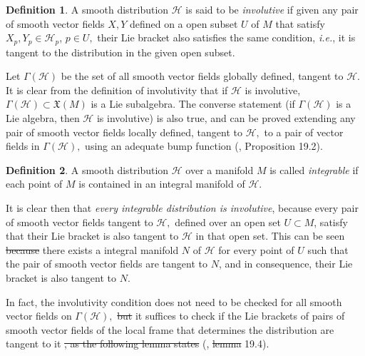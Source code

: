 \documentclass[12pt, letterpaper, reqno]{amsart}
\theoremstyle{definition}
\newtheorem{df}{Definition}
\theoremstyle{plain}
\theoremstyle{remark}
\providecommand{\DIFadd}[1]{{\protect\color{blue}\uwave{#1}}} %
\providecommand{\DIFdel}[1]{{\protect\color{red}\sout{#1}}}                      %
\providecommand{\DIFaddbegin}{} %
\providecommand{\DIFaddend}{} %
\providecommand{\DIFdelbegin}{} %
\providecommand{\DIFdelend}{} %
\newcommand{\DIFscaledelfig}{0.5}
\newlength{\DIFdelgraphicswidth} %
\newlength{\DIFdelgraphicsheight} %
\newcommand{\DIFaddincludegraphics}[2][]{{\color{blue}\fbox{\DIFOincludegraphics[#1]{#2}}}} %
\newcommand{\DIFdelincludegraphics}[2][]{%
\sbox{\DIFdelgraphicsbox}{\DIFOincludegraphics[#1]{#2}}%
\settoboxwidth{\DIFdelgraphicswidth}{\DIFdelgraphicsbox} %
\settoboxtotalheight{\DIFdelgraphicsheight}{\DIFdelgraphicsbox} %
\scalebox{\DIFscaledelfig}{%
\parbox[b]{\DIFdelgraphicswidth}{\usebox{\DIFdelgraphicsbox}\\[-\baselineskip] \rule{\DIFdelgraphicswidth}{0em}}\llap{\resizebox{\DIFdelgraphicswidth}{\DIFdelgraphicsheight}{%
\setlength{\unitlength}{\DIFdelgraphicswidth}%
\begin{picture}(1,1)%
\thicklines\linethickness{2pt} %
{\color[rgb]{1,0,0}\put(0,0){\framebox(1,1){}}}%
{\color[rgb]{1,0,0}\put(0,0){\line( 1,1){1}}}%
{\color[rgb]{1,0,0}\put(0,1){\line(1,-1){1}}}%
\end{picture}%
}\hspace*{3pt}}} %
} %
\DeclareRobustCommand{\DIFaddbegin}{\DIFOaddbegin \let\includegraphics\DIFaddincludegraphics} %
\DeclareRobustCommand{\DIFaddend}{\DIFOaddend \let\includegraphics\DIFOincludegraphics} %
\DeclareRobustCommand{\DIFdelbegin}{\DIFOdelbegin \let\includegraphics\DIFdelincludegraphics} %
\DeclareRobustCommand{\DIFdelend}{\DIFOaddend \let\includegraphics\DIFOincludegraphics} %
\begin{document}
\begin{df}

A smooth distribution $ \mathcal{H} $ is said to be \textit{involutive} if given any pair of smooth vector fields $ X,Y $ defined on a open subset $ U $  of $ M $  that satisfy $X_p,Y_p\in \mathcal{H}_p $, $ p\in U, $ their Lie bracket also satisfies the same condition, \textit{i.e.}, it is tangent to the distribution in the given open subset. 
\end{df}

Let $ \Gamma(\mathcal{H}) $ be the set of all smooth vector fields globally defined, tangent to $ \mathcal{H}. $ It is clear from the definition of involutivity that if $ \mathcal{H} $ is involutive, $ \Gamma (\mathcal{H})\subset \mathfrak{X}(M) $ is a Lie subalgebra. The converse statement (if $ \Gamma(\mathcal{H}) $ is a Lie algebra, then $ \mathcal{H} $ is involutive) is also true, and can be proved extending any pair of smooth vector fields locally defined, tangent to $ \mathcal{H} ,$ to a pair of vector fields in $ \Gamma( \mathcal{H}), $ using an adequate bump function (\cite{lee2003introduction}, Proposition 19.2). 

\begin{df}
	A smooth distribution $ \mathcal{H} $ over a manifold $ M $ is called \textit{integrable} if each point of $ M $ is contained in an integral manifold of $ \mathcal{H}. $  
\end{df}
It is clear then that \textit{every integrable distribution is involutive}, because every pair of smooth vector fields tangent to $ \mathcal{H}, $ defined over an open set $ U\subset M $, satisfy that their Lie bracket is also tangent to $ \mathcal{H} $ in that open set. This can be seen \DIFdelbegin \DIFdel{because }\DIFdelend \DIFaddbegin \DIFadd{noticing that }\DIFaddend there exists a integral manifold $ N $  of $ \mathcal{H} $ for every point of $ U $ such that the pair of smooth vector fields are tangent to $ N $, and in consequence, their Lie bracket is also tangent to $ N. $  

In fact, the involutivity condition does not need to be checked for all smooth vector fields on $ \Gamma( \mathcal{H}), $ \DIFdelbegin \DIFdel{but }\DIFdelend \DIFaddbegin \DIFadd{as }\DIFaddend it suffices to check if the Lie brackets of pairs of smooth vector fields of the local frame that determines the distribution are tangent to it \DIFdelbegin \DIFdel{, as the following lemma states }\DIFdelend (\cite{lee2003introduction}, \DIFdelbegin \DIFdel{lemma }\DIFdelend \DIFaddbegin \DIFadd{Lemma }\DIFaddend 19.4).
\end{document}
